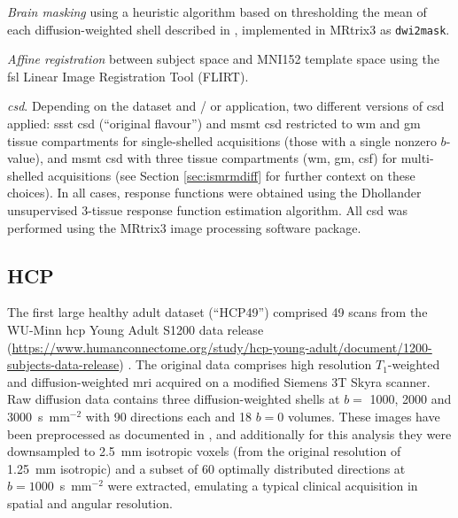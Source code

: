 \textit{Brain masking}\autocite{Tournier2019}
using a heuristic algorithm based on thresholding the mean of each diffusion-weighted shell described in \textcite{Dhollander2016}, implemented in MRtrix3\autocite{Tournier2019} as \verb|dwi2mask|.

\textit{Affine registration} between subject space and MNI152\autocite{Fonov2011} template space using the \gls{fsl} Linear Image Registration Tool (FLIRT)\autocite{Jenkinson2001,Jenkinson2002}.

\textit{\Gls{csd}}. Depending on the dataset and / or application, two different versions of \gls{csd} applied: \gls{ssst} \gls{csd}\autocite{Tournier2007,Tournier2019} (``original flavour'') and \gls{msmt} \gls{csd}\autocite{Jeurissen2014} restricted to \gls{wm} and \gls{gm} tissue compartments for single-shelled acquisitions (those with a single nonzero $b$-value),
and \gls{msmt} \gls{csd} with three tissue compartments (\gls{wm}, \gls{gm}, \gls{csf}) for multi-shelled acquisitions (see Section \ref{sec:ismrmdiff} for further context on these choices).
In all cases, response functions were obtained using the Dhollander unsupervised 3-tissue response function estimation algorithm\autocite{Dhollander2016,Dhollander2019}.
All \gls{csd} was performed using the MRtrix3 image processing software package\autocite{Tournier2019}.

\subsection{HCP}

The first large healthy adult dataset (``HCP49'') comprised 49 scans from the WU-Minn \gls{hcp} Young Adult S1200 data release (\url{https://www.humanconnectome.org/study/hcp-young-adult/document/1200-subjects-data-release}) \autocite{VanEssen2013}.
The original data comprises high resolution $T_1$-weighted and diffusion-weighted \gls{mri} acquired on a modified Siemens 3T Skyra scanner.
Raw diffusion data contains three diffusion-weighted shells at $b=$ 1000, 2000 and 3000~s~mm$^{-2}$ with 90 directions each and 18 $b=0$ volumes\autocite{Sotiropoulos2013}.
These images have been preprocessed as documented in \textcite{Glasser2013,Sotiropoulos2013},
and additionally for this analysis they were downsampled to 2.5~mm isotropic voxels (from the original resolution of 1.25~mm isotropic) and a subset of 60 optimally distributed directions at $b=1000$~s~mm$^{-2}$ were extracted, emulating a typical clinical acquisition in spatial and angular resolution.

